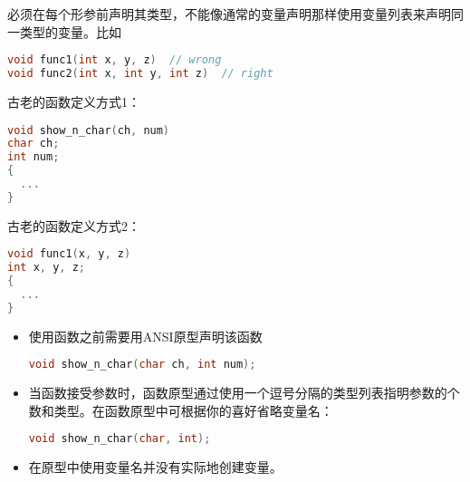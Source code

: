 \begin{frame}[fragile]
必须在每个形参前声明其类型，不能像通常的变量声明那样使用变量列表来声明同一类型的变量。比如
\begin{lstlisting}[language=c,backgroundcolor=\color{red!10}]
void func1(int x, y, z)  // wrong 
void func2(int x, int y, int z)  // right
\end{lstlisting}

\end{frame}

\begin{frame}[fragile]
古老的函数定义方式1：
\begin{lstlisting}[language=c,backgroundcolor=\color{red!10}]
void show_n_char(ch, num)
char ch;
int num;
{
  ...
}
\end{lstlisting}
\end{frame}

\begin{frame}[fragile]
古老的函数定义方式2：
\begin{lstlisting}[language=c,backgroundcolor=\color{red!10}]
void func1(x, y, z)
int x, y, z;
{
  ... 
}
\end{lstlisting}
\end{frame}

\begin{frame}[fragile]
\begin{itemize}
\item
使用函数之前需要用ANSI原型声明该函数
\begin{lstlisting}[language=c,backgroundcolor=\color{red!10}]
void show_n_char(char ch, int num);
\end{lstlisting}
\vspace{0.1in}

\item
当函数接受参数时，函数原型通过使用一个逗号分隔的类型列表指明参数的个数和类型。在函数原型中可根据你的喜好省略变量名：
\begin{lstlisting}[language=c,backgroundcolor=\color{red!10}]
void show_n_char(char, int);
\end{lstlisting}
\vspace{0.1in}

\item
在原型中使用变量名并没有实际地创建变量。
\end{itemize}

\end{frame}

